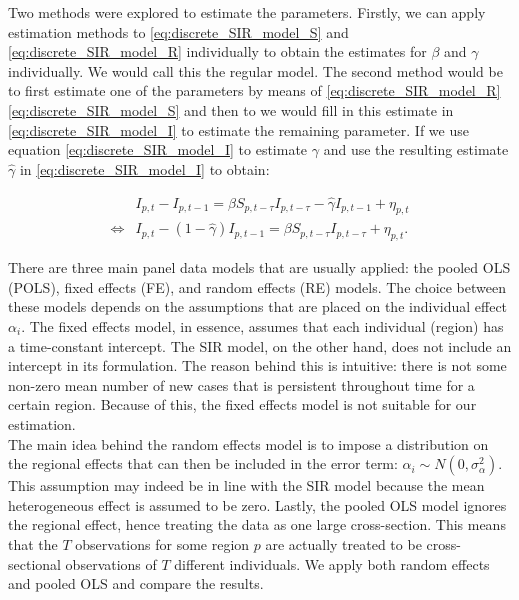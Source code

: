 \documentclass[12pt]{article}
\begin{document}
\begin{appendices}
    	Two methods were explored to estimate the parameters. Firstly, we can apply estimation methods to \eqref{eq:discrete_SIR_model_S} and \eqref{eq:discrete_SIR_model_R} individually to obtain the estimates for $\beta$ and $\gamma$ individually. We would call this the regular model. The second method would be to first estimate one of the parameters by means of \eqref{eq:discrete_SIR_model_R} \eqref{eq:discrete_SIR_model_S} and then to we would fill in this estimate in \eqref{eq:discrete_SIR_model_I} to estimate the remaining parameter. If we use equation \ref{eq:discrete_SIR_model_I} to estimate $\gamma$ and use the resulting estimate $\hat{\gamma}$ in \eqref{eq:discrete_SIR_model_I} to obtain:
    	    
    	    \begin{equation} \label{eq:discrete_SIR_model_I_twostep}
    	        \begin{split}
            		& I_{p,t} - I_{p,t-1} = \beta S_{p,t-\tau}I_{p,t-\tau} - \hat{\gamma} I_{p,t-1} + \eta_{p,t} \\
        	        \iff & I_{p,t} - \left(1 - \hat{\gamma}\right) I_{p,t-1} = \beta S_{p,t-\tau}I_{p,t-\tau} + \eta_{p,t}.
        		\end{split}
    	    \end{equation}
	
	    There are three main panel data models that are usually applied: the pooled OLS (POLS), fixed effects (FE), and random effects (RE) models. The choice between these models depends on the assumptions that are placed on the individual effect $\alpha_i$. The fixed effects model, in essence, assumes that each individual (region) has a time-constant intercept. The SIR model, on the other hand, does not include an intercept in its formulation. The reason behind this is intuitive: there is not some non-zero mean number of new cases that is persistent throughout time for a certain region. Because of this, the fixed effects model is not suitable for our estimation. \\
    	
    	The main idea behind the random effects model is to impose a distribution on the regional effects that can then be included in the error term: $\alpha_i \sim N\left(0, \sigma^2_{\alpha}\right)$. This assumption may indeed be in line with the SIR model because the mean heterogeneous effect is assumed to be zero. Lastly, the pooled OLS model ignores the regional effect, hence treating the data as one large cross-section. This means that the $T$ observations for some region $p$ are actually treated to be cross-sectional observations of $T$ different individuals. We apply both random effects and pooled OLS and compare the results.
	

\end{appendices}
\end{document}

